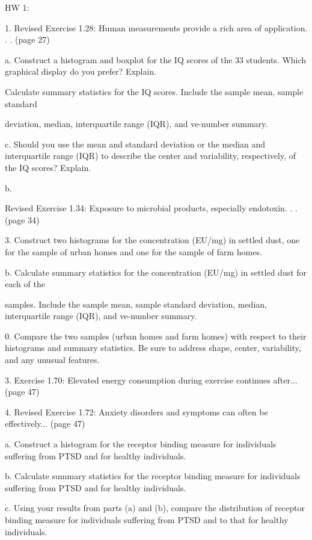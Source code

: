 \documentclass[12pt]{article}
\author{Rose Xu}
\date{\today}
\begin{document}
\maketitle

HW 1:

1. Revised Exercise 1.28: Human measurements provide a rich area of application. . . (page 27)

a. Construct a histogram and boxplot for the IQ scores of the 33 students. Which graphical
display do you prefer? Explain.

Calculate summary statistics for the IQ scores. Include the sample mean, sample standard

deviation, median, interquartile range (IQR), and ve-number summary.

c. Should you use the mean and standard deviation or the median and interquartile range (IQR) to
describe the center and variability, respectively, of the IQ scores? Explain.

b.

Revised Exercise 1.34: Exposure to microbial products, especially endotoxin. . . (page 34)

3. Construct two histograms for the concentration (EU/mg) in settled dust, one for the sample of
urban homes and one for the sample of farm homes.

b. Calculate summary statistics for the concentration (EU/mg) in settled dust for each of the

samples. Include the sample mean, sample standard deviation, median, interquartile range
(IQR), and ve-number summary.

0. Compare the two samples (urban homes and farm homes) with respect to their histograms and
summary statistics. Be sure to address shape, center, variability, and any unusual features.

3. Exercise 1.70: Elevated energy consumption during exercise continues after... (page 47)

4. Revised Exercise 1.72: Anxiety disorders and symptoms can often be effectively... (page 47)

a. Construct a histogram for the receptor binding measure for individuals suffering from PTSD
and for healthy individuals.

b. Calculate summary statistics for the receptor binding measure for individuals suffering from
PTSD and for healthy individuals.

c. Using your results from parts (a) and (b), compare the distribution of receptor binding measure
for individuals suffering from PTSD and to that for healthy individuals.
\end{document}
